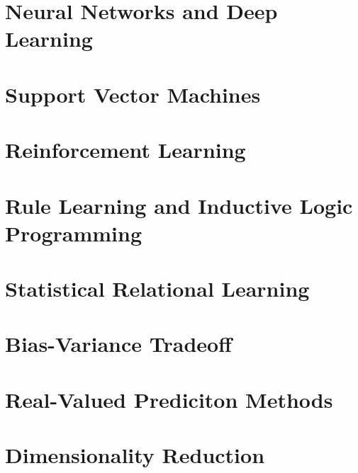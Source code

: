 \documentclass{article}
\begin{document}
	\section{Neural Networks and Deep Learning}
		\clearpage

	\section{Support Vector Machines}
		\clearpage

	\section{Reinforcement Learning}
		\clearpage
	
	\section{Rule Learning and Inductive Logic Programming}
		\clearpage	

	\section{Statistical Relational Learning}
		\clearpage

	\section{Bias-Variance Tradeoff}
		\clearpage

	\section{Real-Valued Prediciton Methods}
		\clearpage

	\section{Dimensionality Reduction}
		\clearpage

	\appendix


	
\end{document}
